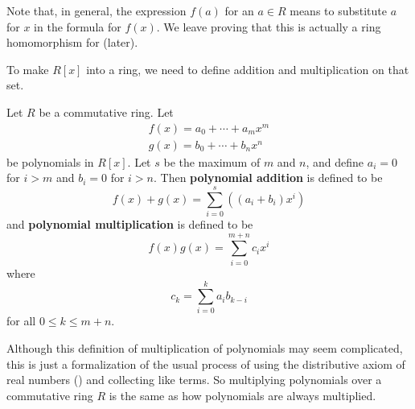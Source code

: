 Note that, in general, the expression $f(a)$ for an $a \in R$ means to substitute $a$ for $x$ in the formula for $f(x)$. We leave proving that this is actually a ring homomorphism for  (later).

To make $R[x]$ into a ring, we need to define addition and multiplication on that set.
\begin{definition}
    Let $R$ be a commutative ring. Let
    \begin{gather*}
        f(x) = a_0 + \cdots + a_mx^m\\
        g(x) = b_0 + \cdots + b_nx^n
    \end{gather*}
    be polynomials in $R[x]$. Let $s$ be the maximum of $m$ and $n$, and define $a_i = 0$ for $i > m$ and $b_i = 0$ for $i > n$. Then \textbf{polynomial addition} is defined to be
    \[
        f(x)+g(x) = \sum_{i=0}^s\left((a_i+b_i)x^i\right)
    \]
    and \textbf{polynomial multiplication} is defined to be
    \[
        f(x)g(x) = \sum_{i=0}^{m+n}c_ix^i
    \]
    where
    \[
        c_k = \sum_{i=0}^k a_ib_{k-i}
    \]
    for all $0 \leq k \leq m + n$.
\end{definition}
Although this definition of multiplication of polynomials may seem complicated, this is just a formalization of the usual process of using the distributive axiom of real numbers () and collecting like terms. So multiplying polynomials over a commutative ring $R$ is the same as how polynomials are always multiplied.


